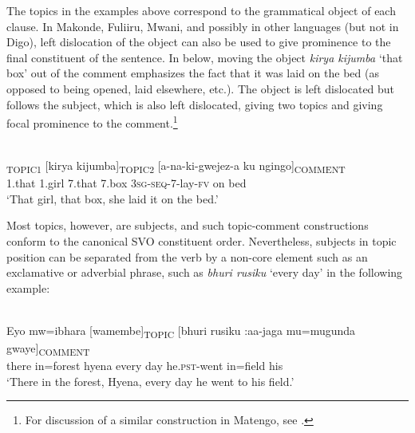 \documentclass[output=paper]{langsci/langscibook}
\begin{document}
The topics in the examples above correspond to the grammatical object of each clause. In Makonde, Fuliiru, Mwani, and possibly in other languages (but not in Digo), left dislocation of the object can also be used to give prominence to the final constituent of the sentence. In  below, moving the object \textit{kirya kijumba} ‘that box’ out of the comment emphasizes the fact that it was laid on the bed (as opposed to being opened, laid elsewhere, etc.). The object is left dislocated but follows the subject, which is also left dislocated, giving two topics and giving focal prominence to the comment.\footnote{For discussion of a similar construction in Matengo, see \citet[756--758]{yoneda2011}.}

\ea\label{ex:4.nicolle}
\\
\textsubscript{TOPIC1} [kirya kijumba]\textsubscript{TOPIC2} [a-na-ki-gwejez-a ku ngingo]\textsubscript{COMMENT}\\
{\db}1.that 1.girl {\db}7.that 7.box {\db}\textsc{3sg-seq}-7-lay-\textsc{fv} on bed\\
\glt ‘That girl, that box, she laid it on the bed.’
\z

Most topics, however, are subjects, and such topic-comment constructions conform to the canonical SVO constituent order. Nevertheless, subjects in topic position can be separated from the verb by a non-core element such as an exclamative or adverbial phrase, such as \textit{bhuri rusiku} ‘every day’ in the following example:


\ea\label{ex:5.nicolle}
\\
\gll Eyo mw=ibhara [wamembe]\textsubscript{TOPIC} [bhuri rusiku :aa-jaga{\rmfnm} mu=mugunda gwaye]\textsubscript{COMMENT}\\
there in=forest {\db}hyena {\db}every  day he.\textsc{pst}-went in=field his \\ 
\glt ‘There in the forest, Hyena, every day he went to his field.’
\z

\end{document}
